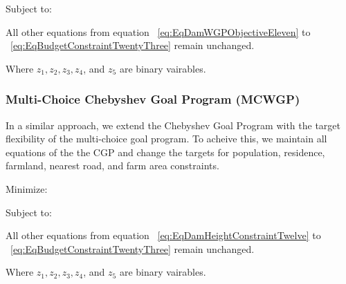 Subject to:
        \EqMCWGPPopulationConstraintFourtyTwo   
        \EqMCWGPResidenceConstraintFourtyThree
        \EqMCWGPFarmlandDistanceConstraintFourtyFour
        \EqMCWGPNearestRoadConstraintFourtyFive
        \EqMCWGPFarmlandAreaConstraintFourtySix
        \begin{center}
                All other equations from equation ~\eqref{eq:EqDamWGPObjectiveEleven} to ~\eqref{eq:EqBudgetConstraintTwentyThree} remain unchanged. 
        \end{center}


Where $ z_1, z_2, z_3, z_4$, and $z_5$ are binary vairables.

\subsubsection{Multi-Choice Chebyshev Goal Program (MCWGP)}
In a similar approach, we extend the Chebyshev Goal Program with the target flexibility of the multi-choice goal program. To acheive this, we maintain all equations of the the CGP and change the targets for population, residence, farmland, nearest road, and farm area constraints.

Minimize:
              \EqCGPMinFunctionSix

Subject to:
                
              \EqMCWGPPopulationConstraintFourtyTwo   
              \EqMCWGPResidenceConstraintFourtyThree
              \EqMCWGPFarmlandDistanceConstraintFourtyFour
              \EqMCWGPNearestRoadConstraintFourtyFive
              \EqMCWGPFarmlandAreaConstraintFourtySix
              \begin{center}
                      All other equations from equation ~\eqref{eq:EqDamHeightConstraintTwelve} to ~\eqref{eq:EqBudgetConstraintTwentyThree} remain unchanged. 
              \end{center}
              \EqSelectThreeDamsTwentyTwo
              \EqBudgetConstraintTwentyThree
              \EqDConstraintOneNTwentyFour
              \EqDConstraintTwoNTwentyFive
              \EqDConstraintThreeNTwentySix
              \EqDConstraintFourNTwentySix
              \EqDConstraintFiveNTwentySeven
              \EqDConstraintSixNTwentyEight
              \EqDConstraintSevenNTwentyNine
              \EqDConstraintEightNThirty
              \EqDConstraintNineNThirtyOne
              \EqDConstraintTenNThirtyTwo

Where $ z_1, z_2, z_3, z_4$, and $z_5$ are binary vairables.

